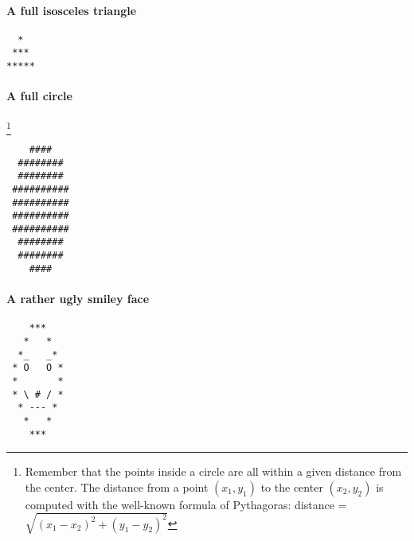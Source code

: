 \documentclass[10pt,a4paper,final]{article}
\begin{document}
\paragraph*{A full isosceles triangle}
\begin{minipage}[c]{0.30\textwidth}

\begin{lstlisting}
  *
 ***
*****
\end{lstlisting}
\end{minipage}


\paragraph*{A full circle}\footnote{Remember that the points inside a circle are all within a given distance from the center. The distance from a point $(x_1, y_1)$ to the center $(x_2, y_2)$ is computed with the well-known formula of Pythagoras: distance = $\sqrt{(x_1-x_2)^2 + (y_1-y_2)^2}$}

\begin{minipage}[c]{0.30\textwidth}
\begin{lstlisting}
    ####
  ########
  ########
 ##########
 ##########
 ##########
 ##########
  ########
  ########
    ####
\end{lstlisting}
\end{minipage}


\paragraph*{A rather ugly smiley face}
\begin{minipage}[c]{0.30\textwidth}
\begin{lstlisting}
    ***
   *   *
  *_   _*
 * O   O *
 *       *
 * \ # / *
  * --- *
   *   *
    ***
\end{lstlisting}
\end{minipage}
\end{document}
